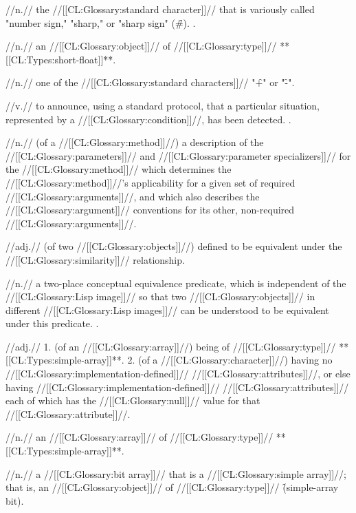  //n.// the //[[CL:Glossary:standard character]]// that is variously called "number sign," "sharp," or "sharp sign" (\f{\#}). \Seefigure\StdCharsThree.

 //n.// an //[[CL:Glossary:object]]// of //[[CL:Glossary:type]]// **[[CL:Types:short-float]]**.

 //n.// one of the //[[CL:Glossary:standard characters]]// "\f{+}" or "\f{-}".

 //v.// to announce, using a standard protocol, that a particular situation, represented by a //[[CL:Glossary:condition]]//, has been detected. \Seesection\ConditionSystemConcepts.

 //n.// (of a //[[CL:Glossary:method]]//) a description of the //[[CL:Glossary:parameters]]// and //[[CL:Glossary:parameter specializers]]// for the //[[CL:Glossary:method]]// which determines the //[[CL:Glossary:method]]//'s applicability for a given set of required //[[CL:Glossary:arguments]]//, and which also describes the //[[CL:Glossary:argument]]// conventions for its other, non-required //[[CL:Glossary:arguments]]//.

 //adj.// (of two //[[CL:Glossary:objects]]//) defined to be equivalent under the //[[CL:Glossary:similarity]]// relationship.

 //n.// a two-place conceptual equivalence predicate, which is independent of the //[[CL:Glossary:Lisp image]]// so that two //[[CL:Glossary:objects]]// in different //[[CL:Glossary:Lisp images]]// can be understood to be equivalent under this predicate. \Seesection\LiteralsInCompiledFiles.

 //adj.// 1. (of an //[[CL:Glossary:array]]//) being of //[[CL:Glossary:type]]// **[[CL:Types:simple-array]]**. 2. (of a //[[CL:Glossary:character]]//) having no //[[CL:Glossary:implementation-defined]]// //[[CL:Glossary:attributes]]//, or else having //[[CL:Glossary:implementation-defined]]// //[[CL:Glossary:attributes]]// each of which has the //[[CL:Glossary:null]]// value for that //[[CL:Glossary:attribute]]//.

 //n.// an //[[CL:Glossary:array]]// of //[[CL:Glossary:type]]// **[[CL:Types:simple-array]]**.

 //n.// a //[[CL:Glossary:bit array]]// that is a //[[CL:Glossary:simple array]]//; that is, an //[[CL:Glossary:object]]// of //[[CL:Glossary:type]]// \f{(simple-array bit)}.

